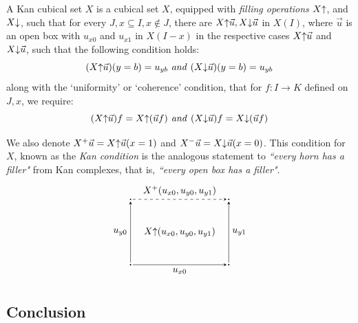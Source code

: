 \begin{definition}
  A Kan cubical set $X$ is a cubical set $X$, equipped with \emph{filling operations} $X\mathord{\uparrow}$, and $X\mathord{\downarrow}$,
  such that for every $J,x \subseteq I, x \notin J$, there are $X\mathord{\uparrow} \vec{u}, X \mathord{\downarrow} \vec{u}$ in $X(I)$, where $\vec{u}$ is an open box
  with $u_{x0}$ and $u_{x1}$ in $X(I - x)$ in the respective cases $X \mathord{\uparrow} \vec{u}$ and $X \mathord{\downarrow} \vec{u}$, such that the following condition holds:
  \[
    (X \mathord{\uparrow} \vec{u})(y = b) = u_{yb} \text{ \emph{and} } (X \mathord{\downarrow} \vec{u})(y = b) = u_{yb}
  \]
  along with the {`uniformity'} or {`coherence'} condition, that for $f : I \to K$ defined on $J,x$, we require:
  \[
    (X \mathord{\uparrow} \vec{u}) f = X \mathord{\uparrow} (\vec{u} f) \text{\emph{ and }} (X \mathord{\downarrow} \vec{u}) f = X \mathord{\downarrow} (\vec{u} f) \]
\end{definition}
We also denote $X^{+} \vec{u} = X \mathord{\uparrow} \vec{u} (x = 1)$ and $X^{-} \vec{u} = X \mathord{\downarrow} \vec{u} (x = 0)$.
This condition for $X$, known as the \emph{Kan condition} is the analogous statement to \emph{``every horn has a filler"} from Kan complexes, that is, \emph{``every open box has a filler"}.
\[
\begin{tikzpicture}[scale=1.2, >=stealth]
  \node[circle, fill, inner sep=0.5pt] (A) at (0,0) {};
  \node[circle, fill, inner sep=0.5pt] (B) at (3,0) {};
  \node[circle, fill, inner sep=0.5pt] (C) at (0,2) {};
  \node[circle, fill, inner sep=0.5pt] (D) at (3,2) {};


  \node[circle, inner sep=1.5pt] (A) at (0,0) {};
  \node[circle, inner sep=1.5pt] (B) at (3,0) {};
  \node[circle, inner sep=1.5pt] (C) at (0,2) {};
  \node[circle, inner sep=1.5pt] (D) at (3,2) {};

  \draw[->] (A) -- node[below] {$u_{x0}$} (B);
  \draw[->] (A) -- node[left] {$u_{y0}$} (C);
  \draw[->] (B) -- node[right] {$u_{y1}$} (D);

  \draw[->, dashed] (C) -- node[above] {$X^{+} (u_{x0},u_{y0},u_{y1})$} (D);

  \node at (1.5,1) {$X \fillup (u_{x0},u_{y0},u_{y1})$};

\end{tikzpicture}
\]

\subsection{Conclusion}

